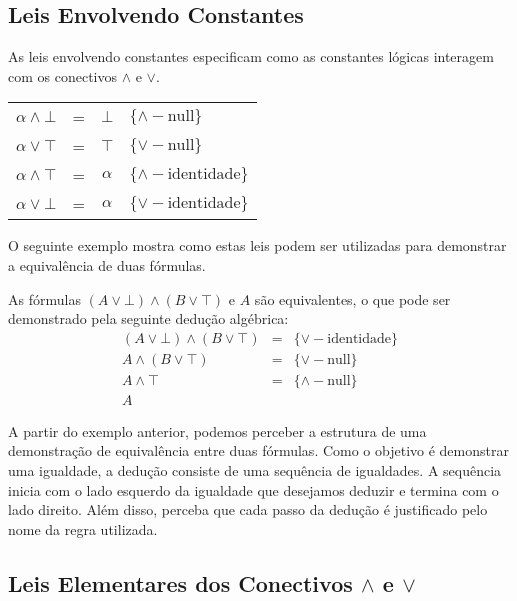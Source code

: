\subsection{Leis Envolvendo Constantes}

As leis envolvendo constantes especificam como as constantes lógicas
interagem com os conectivos $\land$ e $\lor$.

\begin{table}[h]
    \begin{tabular}{|cccl|}
        \hline
             $\alpha \land \bot$ & = & $\bot$ &
             $\{\land-\text{null}\}$\\
             $\alpha \lor \top$ & = & $\top$ &
             $\{\lor-\text{null}\}$\\
             $\alpha \land \top$ & = & $\alpha$ & $\{\land-\text{identidade}\}$\\
             $\alpha \lor \bot$ & = & $\alpha$ & $\{\lor-\text{identidade}\}$\\
        \hline
    \end{tabular}
    \centering
\end{table}

O seguinte exemplo mostra como estas leis podem ser utilizadas para
demonstrar a equivalência de duas fórmulas.

\begin{Example}
As fórmulas $(A \lor \bot)\land(B \lor \top)$ e $A$ são
equivalentes, o que pode ser demonstrado pela seguinte dedução
algébrica:
\[
\begin{array}{lcl}
(A \lor \bot)\land(B \lor \top) & = &\{\lor-\text{identidade}\} \\
A \land (B\lor \top) & = & \{\lor-\text{null}\}\\
A \land \top & = & \{\land-\text{null}\}\\
A & &
\end{array}
\]
\end{Example}

A partir do exemplo anterior, podemos perceber a estrutura de uma
demonstração de equivalência entre duas fórmulas. Como o objetivo é
demonstrar uma igualdade, a dedução consiste de uma sequência de
igualdades. A sequência inicia com o lado esquerdo da igualdade que
desejamos deduzir e termina com o lado direito. Além disso, perceba
que cada passo da dedução é justificado pelo nome da regra utilizada.


\subsection{Leis Elementares dos Conectivos $\land$ e $\lor$}

